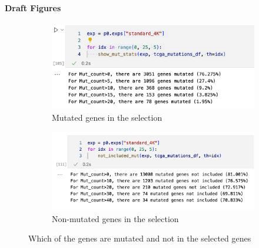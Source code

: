 \paragraph{Draft Figures}

\begin{figure}
    \captionsetup[subfigure]{justification=Centering}
    \begin{subfigure}[t]{0.75\textwidth}
        \includegraphics[width=\textwidth]{Sections/Network_I/Resources/Gene_selection/included_mut.png}
        \caption{Mutated genes in the selection}
    \end{subfigure}\hspace{\fill} %

    \bigskip %
    \begin{subfigure}[t]{0.75\textwidth}
        \includegraphics[width=\linewidth]{Sections/Network_I/Resources/Gene_selection/not_included_mut.png}
        \caption{Non-mutated genes in the selection}
    \end{subfigure}\hspace{\fill} %

    \caption{Which of the genes are mutated and not in the selected genes}
    \label{fig:N_I:gene_sel}
\end{figure}
